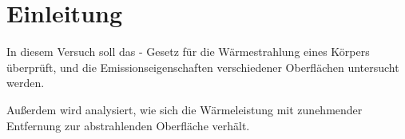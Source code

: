 
\section{Einleitung}
%
In diesem Versuch soll das - Gesetz für die Wärmestrahlung eines Körpers überprüft, und die Emissionseigenschaften verschiedener Oberflächen untersucht werden.

Außerdem wird analysiert, wie sich die Wärmeleistung mit zunehmender Entfernung zur abstrahlenden Oberfläche verhält.
